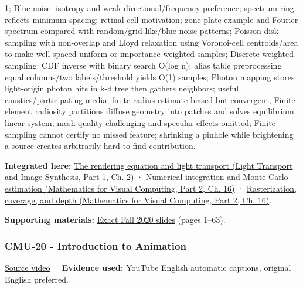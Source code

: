 1; Blue noise: isotropy and weak directional/frequency preference; spectrum ring reflects minimum spacing; retinal cell motivation; zone plate example and Fourier spectrum compared with random/grid-like/blue-noise patterns; Poisson disk sampling with non-overlap and Lloyd relaxation using Voronoi-cell centroids/area to make well-spaced uniform or importance-weighted samples; Discrete weighted sampling: CDF inverse with binary search O(log n); alias table preprocessing equal columns/two labels/threshold yields O(1) samples; Photon mapping stores light-origin photon hits in k-d tree then gathers neighbors; useful caustics/participating media; finite-radius estimate biased but convergent; Finite-element radiosity partitions diffuse geometry into patches and solves equilibrium linear system; mesh quality challenging and specular effects omitted; Finite sampling cannot certify no missed feature; shrinking a pinhole while brightening a source creates arbitrarily hard-to-find contribution.

\textbf{Integrated here:} \href{../04-Light-Transport-and-Image-Synthesis-P01/main.pdf\#03-visual-computing-i-ch007-the-rendering-equation-and-light-transport}{The rendering equation and light transport (Light Transport and Image Synthesis, Part 1, Ch. 2)} · \href{../02-Mathematics-for-Visual-Computing-P02/main.pdf\#03-visual-computing-i-ch012-numerical-integration-and-monte-carlo-estimation}{Numerical integration and Monte Carlo estimation (Mathematics for Visual Computing, Part 2, Ch. 16)} · \href{../02-Mathematics-for-Visual-Computing-P02/main.pdf\#03-visual-computing-i-ch012-rasterization-coverage-and-depth}{Rasterization, coverage, and depth (Mathematics for Visual Computing, Part 2, Ch. 16)}.

\textbf{Supporting materials:} \href{https://15462.courses.cs.cmu.edu/fall2020content/lectures/19_variancereduction/19_variancereduction_slides.pdf}{Exact Fall 2020 slides} (pages 1--63).

\subsubsection{CMU-20 - Introduction to Animation}\label{04-visual-computing-ii-ch036-cmu-20---introduction-to-animation}

\hypertarget{04-visual-computing-ii-ch036-cmu-20---introduction-to-animation}{}

\href{https://www.youtube.com/watch?v=XVTw68iHef0}{Source video} · \textbf{Evidence used:} YouTube English automatic captions, original English preferred.

